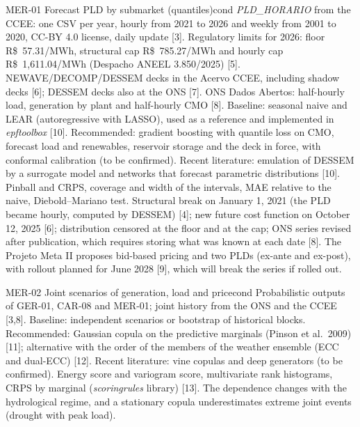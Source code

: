 \begin{ficha}{MER-01 \textperiodcentered{} Forecast PLD by submarket (quantiles)}{cond}
 \emph{PLD\_HORARIO} from the CCEE: one CSV per year, hourly from 2021 to
2026 and weekly from 2001 to 2020, CC-BY 4.0 license, daily update [3].
Regulatory limits for 2026: floor R\$~57.31/MWh, structural cap
R\$~785.27/MWh and hourly cap R\$~1,611.04/MWh (Despacho ANEEL 3.850/2025)
[5]. NEWAVE/DECOMP/DESSEM decks in the Acervo CCEE, including shadow decks [6];
DESSEM decks also at the ONS [7]. ONS Dados Abertos: half-hourly load,
generation by plant and half-hourly CMO [8].
 Baseline: seasonal naive and LEAR (autoregressive
with LASSO), used as a reference and implemented in \emph{epftoolbox} [10].
Recommended: gradient boosting with quantile loss on CMO, forecast load and
renewables, reservoir storage and the deck in force, with
conformal calibration (to be confirmed). Recent literature: emulation of DESSEM by
a surrogate model and networks that forecast parametric distributions [10].
 Pinball and CRPS, coverage and width of the intervals, MAE
relative to the naive, Diebold--Mariano test.
 Structural break on January 1, 2021 (the PLD became hourly,
computed by DESSEM) [4]; new future cost function on October 12, 2025 [6];
distribution censored at the floor and at the cap; ONS series revised after
publication, which requires storing what was known at each date [8]. The
Projeto Meta II proposes bid-based pricing and two PLDs (ex-ante and ex-post), with
rollout planned for June 2028 [9], which will break the series if rolled out.
\end{ficha}

\begin{ficha}{MER-02 \textperiodcentered{} Joint scenarios of generation, load and price}{cond}
 Probabilistic outputs of GER-01, CAR-08 and MER-01; joint
history from the ONS and the CCEE [3,8].
 Baseline: independent scenarios or bootstrap of
historical blocks. Recommended: Gaussian copula on the predictive
marginals (Pinson et al.\ 2009) [11]; alternative with the order of the members of the
weather ensemble (ECC and dual-ECC) [12]. Recent literature: vine copulas and
deep generators (to be confirmed).
 Energy score and variogram score, multivariate rank
histograms, CRPS by marginal (\emph{scoringrules} library) [13].
 The dependence changes with the hydrological regime, and a
stationary copula underestimates extreme joint events (drought with peak load).
\end{ficha}

